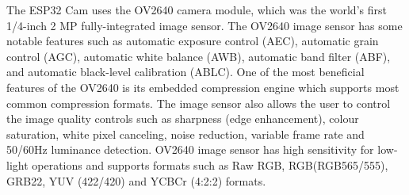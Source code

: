 The ESP32 Cam uses the OV2640 camera module, which was the world’s first 1/4-inch 2 MP fully-integrated image sensor. The OV2640 image sensor has some notable features such as automatic exposure control (AEC), automatic grain control (AGC), automatic white balance (AWB), automatic band filter (ABF), and automatic black-level calibration (ABLC). One of the most beneficial features of the OV2640 is its embedded compression engine which supports most common compression formats. The image sensor also allows the user to control the image quality controls such as sharpness (edge enhancement), colour saturation, white pixel canceling, noise reduction, variable frame rate and 50/60Hz luminance detection. OV2640 image sensor has high sensitivity for low-light operations and supports formats such as Raw RGB, RGB(RGB565/555), GRB22, YUV (422/420) and YCBCr (4:2:2) formats.
\pagebreak

